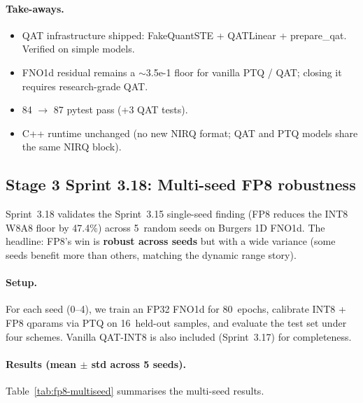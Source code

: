 \documentclass[10pt,twocolumn]{article}
\renewcommand{\texttt}[1]{{\normalfont\ttfamily #1}\normalfont\rmfamily}
\begin{document}
\paragraph{Take-aways.}
\begin{itemize}
\item QAT infrastructure shipped:
\texttt{FakeQuantSTE} + \texttt{QATLinear} +
\texttt{prepare\_qat}.  Verified on simple models.
\item FNO1d residual remains a $\sim$3.5e-1 floor
for vanilla PTQ / QAT; closing it requires
research-grade QAT.
\item 84 $\to$ 87 pytest pass (+3 QAT tests).
\item C++ runtime unchanged (no new NIRQ format;
QAT and PTQ models share the same NIRQ block).
\end{itemize}

\subsection{Stage 3 Sprint 3.18: Multi-seed FP8 robustness}
\label{sec:fp8-multiseed}

Sprint~3.18 validates the Sprint~3.15 single-seed
finding (FP8 reduces the INT8 W8A8 floor by
47.4\%) across 5~random seeds on Burgers 1D FNO1d.
The headline: FP8's win is \textbf{robust across
seeds} but with a wide variance (some seeds
benefit more than others, matching the dynamic
range story).

\paragraph{Setup.}
For each seed (0--4), we train an FP32 FNO1d for
80~epochs, calibrate INT8 + FP8 qparams via PTQ on
16~held-out samples, and evaluate the test set
under four schemes.  Vanilla QAT-INT8 is also
included (Sprint~3.17) for completeness.

\paragraph{Results (mean $\pm$ std across 5 seeds).}
Table~\ref{tab:fp8-multiseed} summarises the
multi-seed results.
\end{document}
